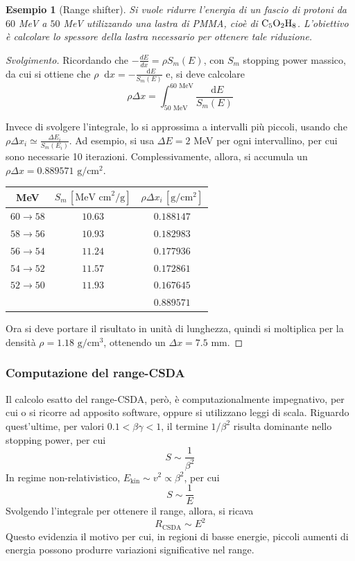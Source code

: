 \documentclass[11pt, a4paper]{scrartcl}
\newenvironment{svolgimento}{\renewcommand\qedsymbol{$\blacksquare$}\begin{proof}[Svolgimento]}{\end{proof}}
\theoremstyle{style}
\newtheorem{esempio}{Esempio}[section]
\theoremstyle{style1}
\newcommand{\dd}{\mathop{}\!\mathrm{d}}
\numberwithin{equation}{subsection}
\begin{document}
\begin{esempio}
	[Range shifter]
	Si vuole ridurre l'energia di un fascio di protoni da $60$ MeV a $50$ MeV utilizzando una lastra di PMMA, cio\`e di $\ce{C_5O_2H_8}$.
L'obiettivo \`e calcolare lo spessore della lastra necessario per ottenere tale riduzione.
\end{esempio}
\begin{svolgimento}
Ricordando che $-\frac{d E}{d x}  = \rho  S_m(E)$, con $S_m$ stopping power massico, da cui si ottiene che $\rho \dd x= - \frac{\dd E}{S_m(E)}$ e, si deve calcolare
\[
\rho \Delta x = \int_{50 \text{ MeV}}^{60 \text{ MeV}} \frac{\dd E}{S_m(E)}
\] 
\begin{center}
	\begin{minipage}
		{.45\columnwidth}
Invece di svolgere l'integrale, lo si approssima a intervalli pi\`u piccoli, usando che $\rho \Delta x_i \simeq \frac{\Delta E_i}{S_m(E_i)}$. 
Ad esempio, si usa $\Delta E = 2$ MeV per ogni intervallino, per cui sono necessarie 10 iterazioni.
Complessivamente, allora, si accumula un $\rho \Delta x = 0.889571 \text{ g}/\text{cm}^2$.
	\end{minipage}
	\hfill
	\begin{minipage}
		{.5\columnwidth}
	\centering
	\begin{tabular}
		{c c c}
		MeV & $S_m \, [\text{MeV cm}^2/\text{g}] $ & $\rho \Delta x_i \, [\text{g}/\text{cm}^2]$\\
		\hline
		$60\to 58$ & $10.63$ & $0.188147$\\
		$58\to 56$ & $10.93$ & $0.182983$\\
		$56\to 54$ & $11.24$ & $0.177936$\\
		$54\to 52$ & $11.57$ & $0.172861$\\
		$52\to 50$ & $11.93$&$0.167645$\\
		\hline
			   & & $0.889571$\\
		\hline
	\end{tabular}
	\end{minipage}
\end{center}
Ora si deve portare il risultato in unit\`a di lunghezza, quindi si moltiplica per la densit\`a $\rho =1.18\text{ g}/\text{cm}^3$, ottenendo un $\Delta x=7.5$ mm.
\end{svolgimento}
\subsubsection{Computazione del range-CSDA}

Il calcolo esatto del range-CSDA, per\`o, \`e computazionalmente impegnativo, per cui o si ricorre ad apposito software, oppure si utilizzano leggi di scala.
Riguardo quest'ultime, per valori $0.1<\beta \gamma< 1$, il termine $1 / \beta ^2$ risulta dominante nello stopping power, per cui 
\[
S \sim \frac{1}{\beta ^2}
\] 
In regime non-relativistico, $E_\text{kin}\sim v^2 \propto \beta ^2$, per cui
\[
S \sim \frac{1}{E}
\] 
Svolgendo l'integrale per ottenere il range, allora, si ricava
\begin{equation}
	R_\text{CSDA}\sim E^2
\end{equation}
Questo evidenzia il motivo per cui, in regioni di basse energie, piccoli aumenti di energia possono produrre variazioni significative nel range.
\end{document}
